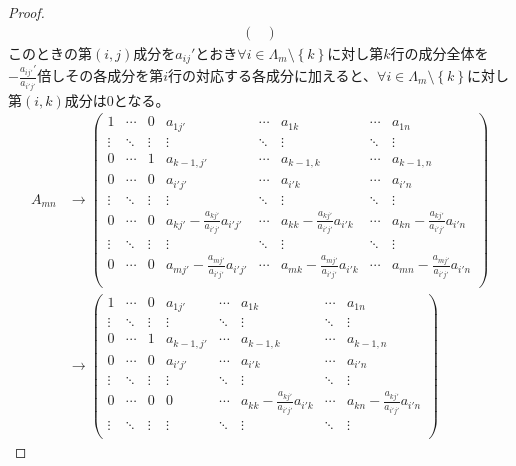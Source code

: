 \documentclass[dvipdfmx]{jsarticle}
\begin{document}
\begin{proof}
\begin{align*}
\begin{pmatrix}
\end{pmatrix}
\end{align*}
このときの第$(i,j)$成分を$a_{ij}'$とおき$\forall i \in \varLambda_{m} \setminus \left\{ k \right\}$に対し第$k$行の成分全体を$- \frac{a_{ij'}'}{a_{i'j'}}$倍しその各成分を第$i$行の対応する各成分に加えると、$\forall i \in \varLambda_{m} \setminus \left\{ k \right\}$に対し第$(i,k)$成分は0となる。
\begin{align*}
A_{mn} &\rightarrow \begin{pmatrix}
1 & \cdots & 0 & a_{1j'} & \cdots & a_{1k} & \cdots & a_{1n} \\
 \vdots & \ddots & \vdots & \vdots & \ddots & \vdots & \ddots & \vdots \\
0 & \cdots & 1 & a_{k - 1,j'} & \cdots & a_{k - 1,k} & \cdots & a_{k - 1,n} \\
0 & \cdots & 0 & a_{i'j'} & \cdots & a_{i'k} & \cdots & a_{i'n} \\
 \vdots & \ddots & \vdots & \vdots & \ddots & \vdots & \ddots & \vdots \\
0 & \cdots & 0 & a_{kj'} - \frac{a_{kj'}}{a_{i'j'}}a_{i'j'} & \cdots & a_{kk} - \frac{a_{kj'}}{a_{i'j'}}a_{i'k} & \cdots & a_{kn} - \frac{a_{kj'}}{a_{i'j'}}a_{i'n} \\
 \vdots & \ddots & \vdots & \vdots & \ddots & \vdots & \ddots & \vdots \\
0 & \cdots & 0 & a_{mj'} - \frac{a_{mj'}}{a_{i'j'}}a_{i'j'} & \cdots & a_{mk} - \frac{a_{mj'}}{a_{i'j'}}a_{i'k} & \cdots & a_{mn} - \frac{a_{mj'}}{a_{i'j'}}a_{i'n} \\
\end{pmatrix}\\
&\rightarrow \begin{pmatrix}
1 & \cdots & 0 & a_{1j'} & \cdots & a_{1k} & \cdots & a_{1n} \\
 \vdots & \ddots & \vdots & \vdots & \ddots & \vdots & \ddots & \vdots \\
0 & \cdots & 1 & a_{k - 1,j'} & \cdots & a_{k - 1,k} & \cdots & a_{k - 1,n} \\
0 & \cdots & 0 & a_{i'j'} & \cdots & a_{i'k} & \cdots & a_{i'n} \\
 \vdots & \ddots & \vdots & \vdots & \ddots & \vdots & \ddots & \vdots \\
0 & \cdots & 0 & 0 & \cdots & a_{kk} - \frac{a_{kj'}}{a_{i'j'}}a_{i'k} & \cdots & a_{kn} - \frac{a_{kj'}}{a_{i'j'}}a_{i'n} \\
 \vdots & \ddots & \vdots & \vdots & \ddots & \vdots & \ddots & \vdots \\

\end{pmatrix}
\end{align*}
\end{proof}
\end{document}
